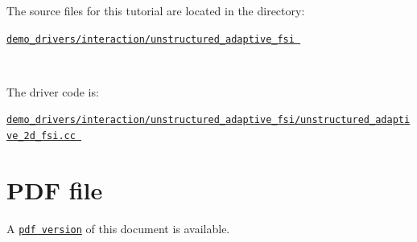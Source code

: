 \begin{DoxyItemize}
\item The source files for this tutorial are located in the directory\+:~\newline
~\newline
\begin{center} \href{../../../../demo_drivers/interaction/unstructured_adaptive_fsi}{\tt demo\+\_\+drivers/interaction/unstructured\+\_\+adaptive\+\_\+fsi } \end{center} ~\newline

\item The driver code is\+: ~\newline
~\newline
\begin{center} \href{../../../../demo_drivers/interaction/unstructured_adaptive_fsi/unstructured_adaptive_2d_fsi.cc}{\tt demo\+\_\+drivers/interaction/unstructured\+\_\+adaptive\+\_\+fsi/unstructured\+\_\+adaptive\+\_\+2d\+\_\+fsi.\+cc } \end{center} 
\end{DoxyItemize}



 

 \hypertarget{index_pdf}{}\section{P\+D\+F file}\label{index_pdf}
A \href{../latex/refman.pdf}{\tt pdf version} of this document is available. 
